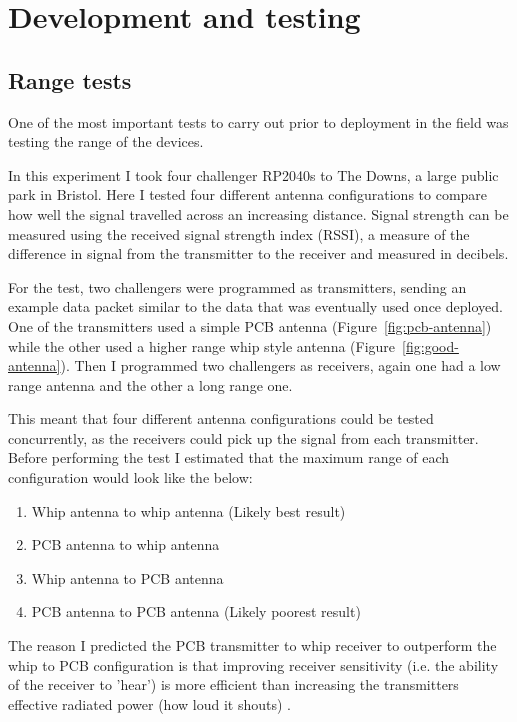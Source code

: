 \section{Development and testing}

\subsection{Range tests}\label{sec:range-tests}

One of the most important tests to carry out prior to deployment in the field
was testing the range of the devices.

In this experiment I took four challenger RP2040s to The Downs, a large public
park in Bristol. Here I tested four different antenna configurations to compare
how well the signal travelled across an increasing distance. Signal strength can
be measured using the received signal strength index (RSSI), a measure of the
difference in signal from the transmitter to the receiver and measured in
decibels.

For the test, two challengers were programmed as transmitters, sending an
example data packet similar to the data that was eventually used once deployed.
One of the transmitters used a simple PCB antenna (Figure~\ref{fig:pcb-antenna})
while the other used a higher range whip style antenna
(Figure~\ref{fig:good-antenna}). Then I programmed two challengers as receivers,
again one had a low range antenna and the other a long range one.

This meant that four different antenna configurations could be tested
concurrently, as the receivers could pick up the signal from each transmitter.
Before performing the test I estimated that the maximum range of each
configuration would look like the below:

\begin{enumerate}
    \item Whip antenna to whip antenna (Likely best result)
    \item PCB antenna to whip antenna
    \item Whip antenna to PCB antenna
    \item PCB antenna to PCB antenna (Likely poorest result)
\end{enumerate}

The reason I predicted the PCB transmitter to whip receiver to outperform the
whip to PCB configuration is that improving receiver sensitivity (i.e. the
ability of the receiver to 'hear') is more efficient than increasing the
transmitters effective radiated power (how loud it shouts) \cite{simpulse25}.

